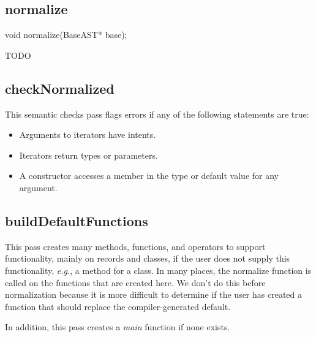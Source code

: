 \documentclass[10pt]{article}
\newcommand{\eg}{\emph{e.g.}}
\begin{document}
\subsection{normalize}

\begin{clang}
void normalize(BaseAST* base);
\end{clang}

TODO

\subsection{checkNormalized}

This semantic checks pass flags errors if any of the following
statements are true:
\begin{itemize}
\item Arguments to iterators have intents.
\item Iterators return types or parameters.
\item A constructor accesses a member in the type or default value for
  any argument.
\end{itemize}

\subsection{buildDefaultFunctions}

This pass creates many methods, functions, and operators to support
functionality, mainly on records and classes, if the user does not
supply this functionality, \eg, a  method for a class.
In many places, the normalize function is called on the functions that
are created here.  We don't do this before normalization because it is
more difficult to determine if the user has created a function that
should replace the compiler-generated default.

In addition, this pass creates a \emph{main} function if none exists.
\end{document}
